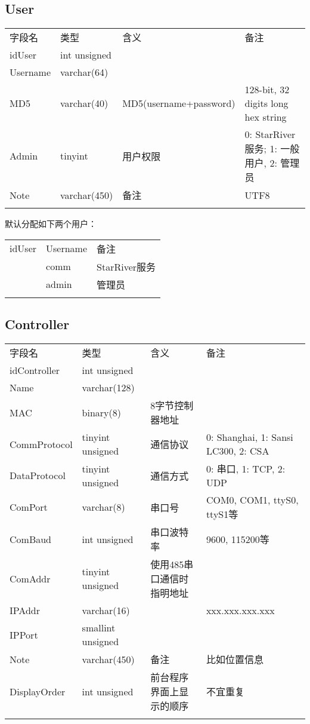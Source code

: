 \subsection{User}\label{user}

\begin{longtabu}[c]{@{}lXXX@{}}
\toprule\addlinespace
字段名 & 类型 & 含义 & 备注
\\\addlinespace
\midrule\endhead
idUser & int unsigned & &
\\\addlinespace
Username & varchar(64) & &
\\\addlinespace
MD5 & varchar(40) & MD5(username+password) & 128-bit, 32 digits long hex
string
\\\addlinespace
Admin & tinyint & 用户权限 & 0: StarRiver服务; 1: 一般用户, 2: 管理员
\\\addlinespace
Note & varchar(450) & 备注 & UTF8
\\\addlinespace
\bottomrule
\end{longtabu}

默认分配如下两个用户：

\begin{longtabu}[c]{@{}lll@{}}
\toprule\addlinespace
idUser & Username & 备注
\\\addlinespace
\midrule{} & comm & StarRiver服务
\\ & admin & 管理员
\\\addlinespace
\bottomrule
\end{longtabu}

\subsection{Controller}\label{controller}

\begin{longtabu}[c]{@{}lXXX@{}}
\toprule\addlinespace
字段名 & 类型 & 含义 & 备注
\\\addlinespace
\midrule\endhead
idController & int unsigned & &
\\\addlinespace
Name & varchar(128) & &
\\\addlinespace
MAC & binary(8) & 8字节控制器地址 &
\\\addlinespace
CommProtocol & tinyint unsigned & 通信协议 & 0: Shanghai, 1: Sansi
LC300, 2: CSA
\\\addlinespace
DataProtocol & tinyint unsigned & 通信方式 & 0: 串口, 1: TCP, 2: UDP
\\\addlinespace
ComPort & varchar(8) & 串口号 & COM0, COM1, ttyS0, ttyS1等
\\\addlinespace
ComBaud & int unsigned & 串口波特率 & 9600, 115200等
\\\addlinespace
ComAddr & tinyint unsigned & 使用485串口通信时指明地址 &
\\\addlinespace
IPAddr & varchar(16) & & xxx.xxx.xxx.xxx
\\\addlinespace
IPPort & smallint unsigned & &
\\\addlinespace
Note & varchar(450) & 备注 & 比如位置信息
\\\addlinespace
DisplayOrder & int unsigned & 前台程序界面上显示的顺序 & 不宜重复
\\\addlinespace
\bottomrule
\end{longtabu}

